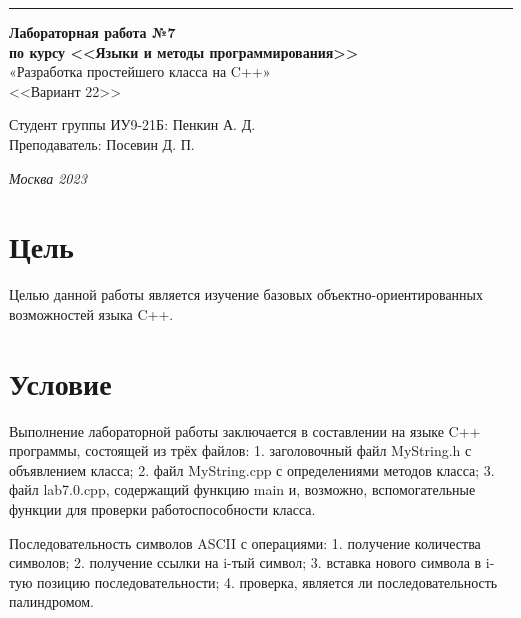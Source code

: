 ﻿\documentclass[a4paper, 12pt]{extarticle}
\begin{document}
\begin{titlepage}
\vspace*{-16pt}
\hspace{30pt}\rule{0.866\textwidth}{0.4pt}
  
\vspace{6em}

\begin{center}
\Large {\bf Лабораторная работа №7} \\ 
\large {\bf по курсу <<Языки и методы программирования>>} \\ 
\large «Разработка простейшего класса на C++» \\
\large <<Вариант 22>>
\end{center}\normalsize

\vspace{15em}


\begin{flushright}
  {Студент группы ИУ9-21Б: Пенкин А. Д.\hspace*{15pt} \\
  \vspace{2ex}
  Преподаватель: Посевин Д. П.\hspace*{15pt}}
\end{flushright}

\bigskip

\vfill
 \vspace{7em}

\begin{center}
\textsl{Москва 2023}
\end{center}
\end{titlepage}

\renewcommand{\ttdefault}{pcr}

\setlength{\tabcolsep}{3pt}
\newpage
\setcounter{page}{2}

\section{Цель}\label{Sect::task}
\par
Целью данной работы является изучение базовых объектно-ориентированных
возможностей языка C++. 
\section{Условие}
\par
Выполнение лабораторной работы заключается в составлении на языке C++
программы, состоящей из трёх файлов:
1. заголовочный файл MyString.h с объявлением класса;
2. файл MyString.cpp с определениями методов класса;
3. файл lab7.0.cpp, содержащий функцию main и, возможно, вспомогательные
функции для проверки работоспособности класса. 
\par
Последовательность символов ASCII с операциями:
1. получение количества символов;
2. получение ссылки на i-тый символ;
3. вставка нового символа в i-тую позицию
последовательности;
4. проверка, является ли последовательность
палиндромом. 
\end{document}
